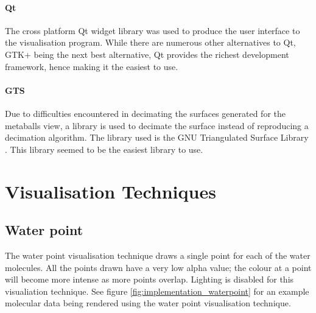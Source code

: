 
\paragraph{Qt}

The cross platform Qt widget library \citep{Qt} was used to produce the user
interface to the visualisation program. While there are numerous other
alternatives to Qt, GTK+ being the next best alternative, Qt provides the
richest development framework, hence making it the easiest to use.


\paragraph{GTS}

Due to difficulties encountered in decimating the surfaces generated for the
metaballs view, a library is used to decimate the surface instead of
reproducing a decimation algorithm. The library used is the GNU Triangulated
Surface Library \citep{GTS}. This library seemed to be the easiest library to
use.



\section{Visualisation Techniques}
\label{sec:implementation_techniques}


\subsection{Water point}
\label{sub:implementation_point}

The water point visualisation technique draws a single point for each of the
water molecules. All the points drawn have a very low alpha value; the colour
at a point will become more intense as more points overlap. Lighting is
disabled for this visualiation technique. See figure
\ref{fig:implementation_waterpoint} for an example molecular data being rendered using
the water point visualisation technique.

